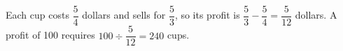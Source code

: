 Each cup costs $\dfrac{5}{4}$ dollars and sells for $\dfrac{5}{3}$, so its profit is $\dfrac{5}{3}-\dfrac{5}{4}=\dfrac{5}{12}$ dollars. A profit of 100 requires $100\div\dfrac{5}{12}=\boxed{240}$ cups.
